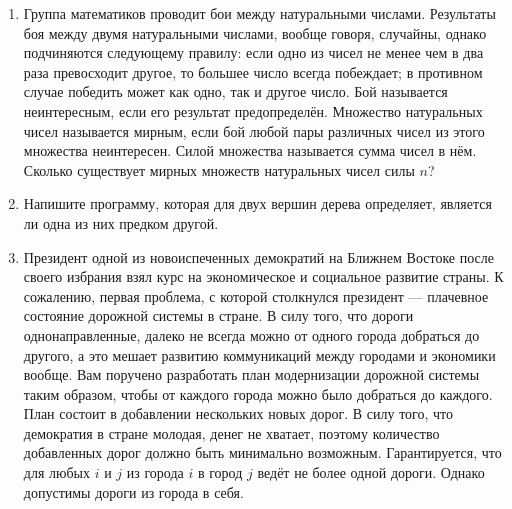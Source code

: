 \documentclass[a4paper, 12pt]{article}
\begin{document}
\begin{enumerate}
    \item Группа математиков проводит бои между натуральными числами. Результаты боя между двумя натуральными числами, вообще говоря, случайны, однако подчиняются следующему правилу: если одно из чисел не менее чем в два раза превосходит другое, то большее число всегда побеждает; в противном случае победить может как одно, так и другое число. Бой называется неинтересным, если его результат предопределён. Множество натуральных чисел называется мирным, если бой любой пары различных чисел из этого множества неинтересен. Силой множества называется сумма чисел в нём. Сколько существует мирных множеств натуральных чисел силы $n$?
    \item Напишите программу, которая для двух вершин дерева определяет, является ли одна из них предком другой.
    \item Президент одной из новоиспеченных демократий на Ближнем Востоке после своего избрания взял курс на экономическое и социальное развитие страны. К сожалению, первая проблема, с которой столкнулся президент --- плачевное состояние дорожной системы в стране. В силу того, что дороги однонаправленные, далеко не всегда можно от одного города добраться до другого, а это мешает развитию коммуникаций между городами и экономики вообще. Вам поручено разработать план модернизации дорожной системы таким образом, чтобы от каждого города можно было добраться до каждого. План состоит в добавлении нескольких новых дорог. В силу того, что демократия в стране молодая, денег не хватает, поэтому количество добавленных дорог должно быть минимально возможным. Гарантируется, что для любых $i$ и $j$ из города $i$ в город $j$ ведёт не более одной дороги. Однако допустимы дороги из города в себя.
  \end{enumerate}
\end{document}
